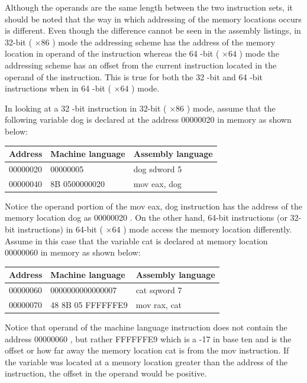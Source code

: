\documentclass[10pt]{book}
\begin{document}
\begin{center}
\begin{center}
\begin{center}
\begin{center}
\begin{center}
Although the operands are the same length between the two instruction sets, it should be noted that the way in which addressing of the memory locations occurs is different. Even though the difference cannot be seen in the assembly listings, in 32-bit ( $\times 86$ ) mode the addressing scheme has the address of the memory location in operand of the instruction whereas the 64 -bit ( $\times 64$ ) mode the addressing scheme has an offset from the current instruction located in the operand of the instruction. This is true for both the 32 -bit and 64 -bit instructions when in 64 -bit ( $\times 64$ ) mode.

In looking at a 32 -bit instruction in 32-bit ( $\times 86$ ) mode, assume that the following variable dog is declared at the address 00000020 in memory as shown below:

\begin{center}
\begin{tabular}{|l|l|l|}
\hline
Address & Machine language & Assembly language \\
\hline
00000020 & 00000005 & dog sdword 5 \\
\hline
00000040 & 8B 0500000020 & mov eax, dog \\
\hline
\end{tabular}
\end{center}

Notice the operand portion of the mov eax, dog instruction has the address of the memory location dog as 00000020 . On the other hand, 64-bit instructions (or 32-bit instructions) in 64-bit ( $\times 64$ ) mode access the memory location differently. Assume in this case that the variable cat is declared at memory location 00000060 in memory as shown below:

\begin{center}
\begin{tabular}{|l|l|l|}
\hline
Address & Machine language & Assembly language \\
\hline
00000060 & 0000000000000007 & cat sqword 7 \\
\hline
00000070 & 48 8B 05 FFFFFFE9 & mov rax, cat \\
\hline
\end{tabular}
\end{center}

Notice that operand of the machine language instruction does not contain the address 00000060 , but rather FFFFFFE9 which is a -17 in base ten and is the offset or how far away the memory location cat is from the mov instruction. If the variable was located at a memory location greater than the address of the instruction, the offset in the operand would be positive.


\end{center}
\end{center}
\end{center}
\end{center}
\end{center}
\end{document}

